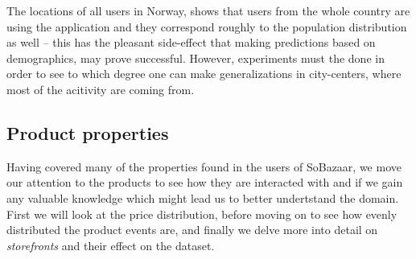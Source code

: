 The locations of all users in Norway, shows that users from the whole country
are using the application and they correspond roughly to the population
distribution as well -- this has the pleasant side-effect that making
predictions based on demographics, may prove successful. However, experiments
must the done in order to see to which degree one can make generalizations in
city-centers, where most of the acitivity are coming from.

\subsection{Product properties}

Having covered many of the properties found in the users of SoBazaar, we move
our attention to the products to see how they are interacted with and if we
gain any valuable knowledge which might lead us to better undertstand the
domain. First we will look at the price distribution, before moving on to see
how evenly distributed the product events are, and finally we delve more into
detail on \textit{storefronts} and their effect on the dataset.

